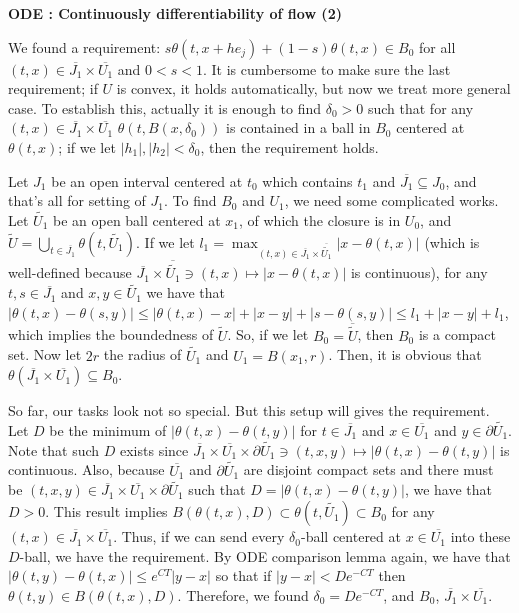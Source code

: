 \documentclass{article}
\begin{document}
\newpage

\textbf{ODE : Continuously differentiability of flow (2)}

We found a requirement: $s\theta(t, x + he_j) + (1 - s)\theta(t, x) \in B_0$ for all $(t, x) \in \overline{J_1} \times \overline{U_1}$ and $0 < s < 1$.
It is cumbersome to make sure the last requirement; if $U$ is convex, it holds automatically, but now we treat more general case.
To establish this, actually it is enough to find $\delta_0 > 0$ such that for any $(t, x) \in \overline{J_1} \times \overline{U_1}$ $\theta(t, B(x, \delta_0))$ is contained in a ball in $B_0$ centered at $\theta(t, x)$; if we let $|h_1|, |h_2| < \delta_0$, then the requirement holds.

Let $J_1$ be an open interval centered at $t_0$ which contains $t_1$ and $\overline{J_1} \subseteq J_0$, and that's all for setting of $J_1$.
To find $B_0$ and $U_1$, we need some complicated works.
Let $\tilde{U_1}$ be an open ball centered at $x_1$, of which the closure is in $U_0$, and $\tilde{U} = \bigcup_{t \in \overline{J_1}} \theta(t, \tilde{U_1})$.
If we let $l_1 = \max_{(t, x) \in \overline{J_1} \times \overline{\tilde{U_1}}} |x - \theta(t, x)|$ (which is well-defined because $\overline{J_1} \times \overline{\tilde{U_1}} \ni (t, x) \mapsto |x - \theta(t, x)|$ is continuous), for any $t, s \in \overline{J_1}$ and $x, y \in \tilde{U_1}$ we have that $|\theta(t, x) - \theta(s, y)| \le |\theta(t, x) - x| + |x - y| + |s - \theta(s, y)| \le l_1 + |x - y| + l_1$, which implies the boundedness of $\tilde{U}$.
So, if we let $B_0 = \overline{\tilde{U}}$, then $B_0$ is a compact set.
Now let $2r$ the radius of $\tilde{U_1}$ and $U_1 = B(x_1, r)$.
Then, it is obvious that $\theta(\overline{J_1} \times \overline{U_1}) \subseteq B_0$.

So far, our tasks look not so special.
But this setup will gives the requirement.
Let $D$ be the minimum of $|\theta(t, x) - \theta(t, y)|$ for $t \in \overline{J_1}$ and $x \in \overline{U_1}$ and $y \in \partial \tilde{U_1}$.
Note that such $D$ exists since $\overline{J_1} \times \overline{U_1} \times \partial \tilde{U_1} \ni (t, x, y) \mapsto |\theta(t, x) - \theta(t, y)|$ is continuous.
Also, because $\overline{U_1}$ and $\partial \tilde{U_1}$ are disjoint compact sets and there must be $(t, x, y) \in \overline{J_1} \times \overline{U_1} \times \partial \tilde{U_1}$ such that $D = |\theta(t, x) - \theta(t, y)|$, we have that $D > 0$.
This result implies $B(\theta(t, x), D) \subset \theta(t, \tilde{U_1}) \subset B_0$ for any $(t, x) \in \overline{J_1} \times \overline{U_1}$.
Thus, if we can send every $\delta_0$-ball centered at $x \in \overline{U_1}$ into these $D$-ball, we have the requirement.
By ODE comparison lemma again, we have that $|\theta(t, y) - \theta(t, x)| \le e^{CT} |y - x|$ so that if $|y - x| < De^{-CT}$ then $\theta(t, y) \in B(\theta(t, x), D)$.
Therefore, we found $\delta_0 = De^{-CT}$, and $B_0$, $\overline{J_1} \times \overline{U_1}$.
\end{document}
